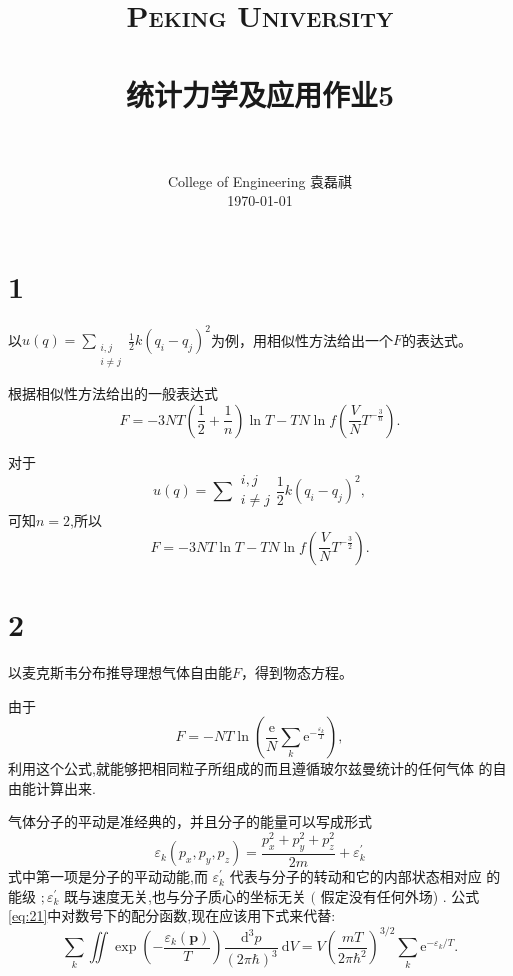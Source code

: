 \documentclass[12pt]{article}
\title{
		\vspace{-1in} 	
		\usefont{OT1}{bch}{b}{n}
		\normalfont \normalsize \textsc{\LARGE Peking University}\\[1cm] %
		\horrule{0.5pt} \\[0.5cm]
		\huge \bfseries{统计力学及应用作业5} \\
		\horrule{2pt} \\[0.5cm]
}
\author{
		\normalfont 								\normalsize
		College of Engineering \quad 2001111690  \quad 袁磊祺\\	\normalsize
        \today
}
\date{}
\begin{document}


\maketitle

\section{1}


以$u(q)=\sum \limits_{\substack{i,j\\i\not= j}}\frac{1}{2}k\left(q_i-q_j\right)^2$为例，用相似性方法给出一个$F$的表达式。

根据相似性方法给出的一般表达式
\begin{equation}
	F = -3NT\left(\frac{1}{2}+\frac{1}{n}\right)\ln T - TN \ln f\left(\frac{V}{N}T^{-\frac{3}{n}}\right).
\end{equation}

对于
\begin{equation}
	u(q)=\sum {\substack{i,j\\i\not= j}}\frac{1}{2}k\left(q_i-q_j\right)^2,
\end{equation}
可知$n=2$,所以
\begin{equation}
	F = -3NT\ln T - TN \ln f\left(\frac{V}{N}T^{-\frac{3}{2}}\right).
\end{equation}



\section{2}

以麦克斯韦分布推导理想气体自由能$F$，得到物态方程。

由于
\begin{equation}
	F=-N T \ln \left(\frac{\mathrm{e}}{N} \sum_{k} \mathrm{e}^{-\frac{\varepsilon_{k}}{T}}\right),
	\label{eq:21}
\end{equation}
利用这个公式,就能够把相同粒子所组成的而且遵循玻尔兹曼统计的任何气体 的自由能计算出来.

气体分子的平动是准经典的，并且分子的能量可以写成形式
\begin{equation}
	\varepsilon_{k}\left(p_{x}, p_{y}, p_{z}\right)=\frac{p_{x}^{2}+p_{y}^{2}+p_{z}^{2}}{2 m}+\varepsilon_{k}^{\prime}
\end{equation}
式中第一项是分子的平动动能,而 $\varepsilon_{k}^{\prime}$ 代表与分子的转动和它的内部状态相对应 的能级 $; \varepsilon_{k}^{\prime}$ 既与速度无关,也与分子质心的坐标无关 $($ 假定没有任何外场) $.$ 公式 \cref{eq:21}中对数号下的配分函数,现在应该用下式来代替:
\begin{equation}
	\sum_{k} \iint \exp \left(-\frac{\varepsilon_{k}(\boldsymbol{p})}{T}\right) \frac{\mathrm{d}^{3} p}{(2 \pi \hbar)^{3}} \mathrm{~d} V=V\left(\frac{m T}{2 \pi \hbar^{2}}\right)^{3 / 2} \sum_{k} \mathrm{e}^{-\varepsilon_{k} / T}.
\end{equation}
\end{document}
